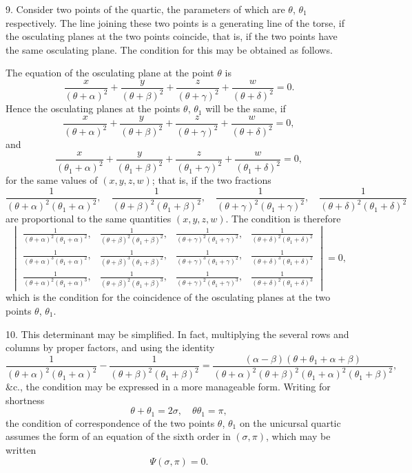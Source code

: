 \documentclass[11pt,a4paper]{article}
\begin{document}
9. Consider two points of the quartic, the parameters of which are $\theta$, $\theta_1$ respectively. The line joining these two points is a generating line of the torse, if the osculating planes at the two points coincide, that is, if the two points have the same osculating plane. The condition for this may be obtained as follows.

The equation of the osculating plane at the point $\theta$ is
\[
\frac{x}{(\theta + \alpha)^2} + \frac{y}{(\theta + \beta)^2} + \frac{z}{(\theta + \gamma)^2} + \frac{w}{(\theta + \delta)^2} = 0.
\]
Hence the osculating planes at the points $\theta$, $\theta_1$ will be the same, if
\[
\frac{x}{(\theta + \alpha)^2} + \frac{y}{(\theta + \beta)^2} + \frac{z}{(\theta + \gamma)^2} + \frac{w}{(\theta + \delta)^2} = 0,
\]
and
\[
\frac{x}{(\theta_1 + \alpha)^2} + \frac{y}{(\theta_1 + \beta)^2} + \frac{z}{(\theta_1 + \gamma)^2} + \frac{w}{(\theta_1 + \delta)^2} = 0,
\]
for the same values of $(x, y, z, w)$; that is, if the two fractions
\[
\frac{1}{(\theta + \alpha)^2(\theta_1 + \alpha)^2},\quad
\frac{1}{(\theta + \beta)^2(\theta_1 + \beta)^2},\quad
\frac{1}{(\theta + \gamma)^2(\theta_1 + \gamma)^2},\quad
\frac{1}{(\theta + \delta)^2(\theta_1 + \delta)^2}
\]
are proportional to the same quantities $(x, y, z, w)$. The condition is therefore
\[
\begin{vmatrix}
\frac{1}{(\theta + \alpha)^2(\theta_1 + \alpha)^2}, &
\frac{1}{(\theta + \beta)^2(\theta_1 + \beta)^2}, &
\frac{1}{(\theta + \gamma)^2(\theta_1 + \gamma)^2}, &
\frac{1}{(\theta + \delta)^2(\theta_1 + \delta)^2} \\
\frac{1}{(\theta + \alpha)^3(\theta_1 + \alpha)^2}, &
\frac{1}{(\theta + \beta)^3(\theta_1 + \beta)^2}, &
\frac{1}{(\theta + \gamma)^3(\theta_1 + \gamma)^2}, &
\frac{1}{(\theta + \delta)^3(\theta_1 + \delta)^2} \\
\frac{1}{(\theta + \alpha)^2(\theta_1 + \alpha)^3}, &
\frac{1}{(\theta + \beta)^2(\theta_1 + \beta)^3}, &
\frac{1}{(\theta + \gamma)^2(\theta_1 + \gamma)^3}, &
\frac{1}{(\theta + \delta)^2(\theta_1 + \delta)^3}
\end{vmatrix} = 0,
\]
which is the condition for the coincidence of the osculating planes at the two points $\theta$, $\theta_1$.

10. This determinant may be simplified. In fact, multiplying the several rows and columns by proper factors, and using the identity
\[
\frac{1}{(\theta + \alpha)^2(\theta_1 + \alpha)^2} - \frac{1}{(\theta + \beta)^2(\theta_1 + \beta)^2} = \frac{(\alpha - \beta)(\theta + \theta_1 + \alpha + \beta)}{(\theta + \alpha)^2(\theta + \beta)^2(\theta_1 + \alpha)^2(\theta_1 + \beta)^2},
\]
\&c., the condition may be expressed in a more manageable form. Writing for shortness
\[
\theta + \theta_1 = 2\sigma,\quad \theta\theta_1 = \pi,
\]
the condition of correspondence of the two points $\theta$, $\theta_1$ on the unicursal quartic assumes the form of an equation of the sixth order in $(\sigma, \pi)$, which may be written
\[
\Psi(\sigma, \pi) = 0.
\]
\end{document}
